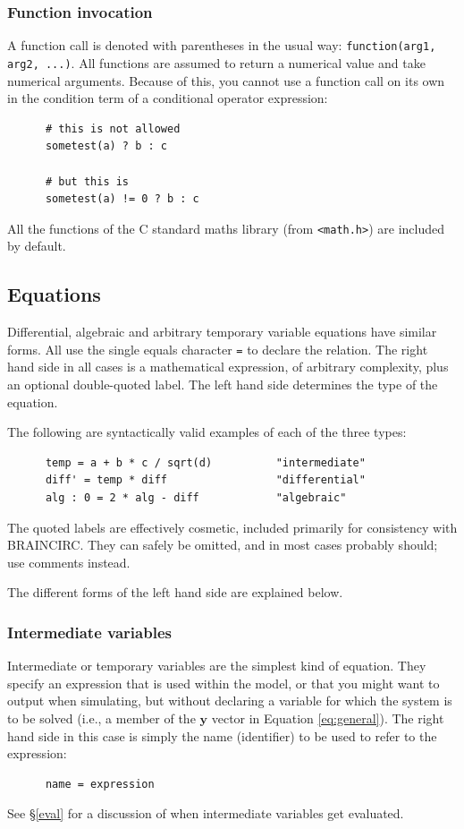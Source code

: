 \documentclass[a4paper,11pt]{article}
\newcommand{\vv}[1]{\mathbf{#1}}
\begin{document}
\subsubsection{Function invocation}
A function call is denoted with parentheses in the usual way: \texttt{function(arg1, arg2, ...)}. All functions are assumed to return a numerical value and take numerical arguments. Because of this, you cannot use a function call on its own in the condition term of a conditional operator expression:
\begin{verbatim}
      # this is not allowed
      sometest(a) ? b : c
      
      # but this is
      sometest(a) != 0 ? b : c
\end{verbatim}
All the functions of the C standard maths library (from \texttt{<math.h>}) are included by default.

\subsection{Equations}\label{eqs}
Differential, algebraic and arbitrary temporary variable equations have similar forms. All use the single equals character \texttt{=} to declare the relation. The right hand side in all cases is a mathematical expression, of arbitrary complexity, plus an optional double-quoted label. The left hand side determines the type of the equation.

The following are syntactically valid examples of each of the three types:
\begin{verbatim}
      temp = a + b * c / sqrt(d)          "intermediate"
      diff' = temp * diff                 "differential"
      alg : 0 = 2 * alg - diff            "algebraic"
\end{verbatim}
The quoted labels are effectively cosmetic, included primarily for consistency with BRAINCIRC. They can safely be omitted, and in most cases probably should; use comments instead.

The different forms of the left hand side are explained below.

\subsubsection{Intermediate variables}\label{temps}

Intermediate or temporary variables are the simplest kind of equation. They specify an expression that is used within the model, or that you might want to output when simulating, but without declaring a variable for which the system is to be solved (i.e., a member of the $\vv{y}$ vector in Equation \ref{eq:general}). The right hand side in this case is simply the name (identifier) to be used to refer to the expression:
\begin{verbatim}
      name = expression
\end{verbatim}
See \S\ref{eval} for a discussion of when intermediate variables get evaluated.
\end{document}
